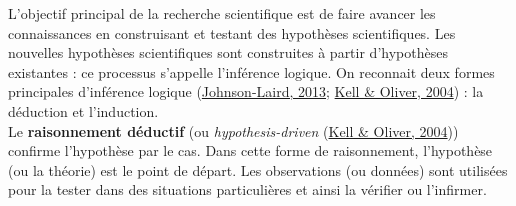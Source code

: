\documentclass[12pt,twoside]{reedthesis}
\begin{document}
L'objectif principal de la recherche scientifique est de faire avancer les connaissances en construisant et testant des hypothèses scientifiques. Les nouvelles hypothèses scientifiques sont construites à partir d'hypothèses existantes : ce processus s'appelle l'inférence logique. On reconnait deux formes principales d'inférence logique (\protect\hyperlink{ref-johnson-laird_human_2013}{Johnson-Laird, 2013}; \protect\hyperlink{ref-kell_here_2004}{Kell \& Oliver, 2004}) : la déduction et l'induction.\\

Le \textbf{raisonnement déductif} (ou \emph{hypothesis-driven} (\protect\hyperlink{ref-kell_here_2004}{Kell \& Oliver, 2004})) confirme l'hypothèse par le cas. Dans cette forme de raisonnement, l'hypothèse (ou la théorie) est le point de départ. Les observations (ou données) sont utilisées pour la tester dans des situations particulières et ainsi la vérifier ou l'infirmer.\\
\end{document}
